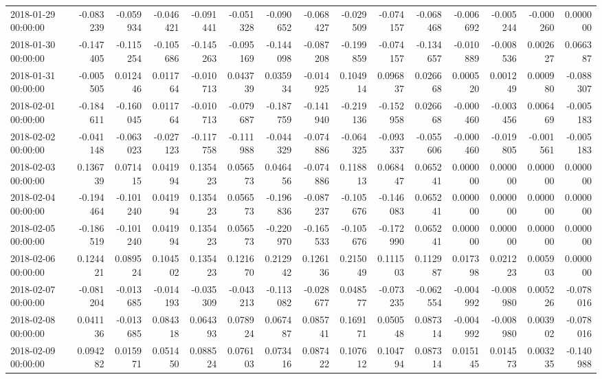 \begin{tabular}{lrrrrrrrrrrrrrr}
2018-01-29 00:00:00 & -0.083239 & -0.059934 & -0.046421 & -0.091441 & -0.051328 & -0.090652 & -0.068427 & -0.029509 & -0.074157 & -0.068468 & -0.006692 & -0.005244 & -0.000260 & 0.000000 \\
2018-01-30 00:00:00 & -0.147405 & -0.115254 & -0.105686 & -0.145263 & -0.095169 & -0.144098 & -0.087208 & -0.199859 & -0.074157 & -0.134657 & -0.010889 & -0.008536 & 0.002627 & 0.066387 \\
2018-01-31 00:00:00 & -0.005505 & 0.012446 & 0.011764 & -0.010713 & 0.043739 & 0.035934 & -0.014925 & 0.104914 & 0.096837 & 0.026668 & 0.000520 & 0.001249 & 0.000980 & -0.088307 \\
2018-02-01 00:00:00 & -0.184611 & -0.160045 & 0.011764 & -0.010713 & -0.079687 & -0.187759 & -0.141940 & -0.219136 & -0.152958 & 0.026668 & -0.000460 & -0.003456 & 0.006469 & -0.005183 \\
2018-02-02 00:00:00 & -0.041148 & -0.063023 & -0.027123 & -0.117758 & -0.111988 & -0.044329 & -0.074886 & -0.064325 & -0.093337 & -0.055606 & -0.000460 & -0.019805 & -0.001561 & -0.005183 \\
2018-02-03 00:00:00 & 0.136739 & 0.071415 & 0.041994 & 0.135423 & 0.056573 & 0.046456 & -0.074886 & 0.118813 & 0.068447 & 0.065241 & 0.000000 & 0.000000 & 0.000000 & 0.000000 \\
2018-02-04 00:00:00 & -0.194464 & -0.101240 & 0.041994 & 0.135423 & 0.056573 & -0.196836 & -0.087237 & -0.105676 & -0.146083 & 0.065241 & 0.000000 & 0.000000 & 0.000000 & 0.000000 \\
2018-02-05 00:00:00 & -0.186519 & -0.101240 & 0.041994 & 0.135423 & 0.056573 & -0.220970 & -0.165533 & -0.105676 & -0.172990 & 0.065241 & 0.000000 & 0.000000 & 0.000000 & 0.000000 \\
2018-02-06 00:00:00 & 0.124421 & 0.089524 & 0.104502 & 0.135423 & 0.121670 & 0.212942 & 0.126136 & 0.215049 & 0.111503 & 0.112987 & 0.017398 & 0.021223 & 0.005903 & 0.000000 \\
2018-02-07 00:00:00 & -0.081204 & -0.013685 & -0.014193 & -0.035309 & -0.043213 & -0.113082 & -0.028677 & 0.048577 & -0.073235 & -0.062554 & -0.004992 & -0.008980 & 0.005226 & -0.078016 \\
2018-02-08 00:00:00 & 0.041136 & -0.013685 & 0.084318 & 0.064393 & 0.078924 & 0.067487 & 0.085741 & 0.169171 & 0.050548 & 0.087314 & -0.004992 & -0.008980 & 0.003902 & -0.078016 \\
2018-02-09 00:00:00 & 0.094282 & 0.015971 & 0.051450 & 0.088524 & 0.076103 & 0.073416 & 0.087422 & 0.107612 & 0.104794 & 0.087314 & 0.015145 & 0.014573 & 0.003235 & -0.140988 \\

\end{tabular}
